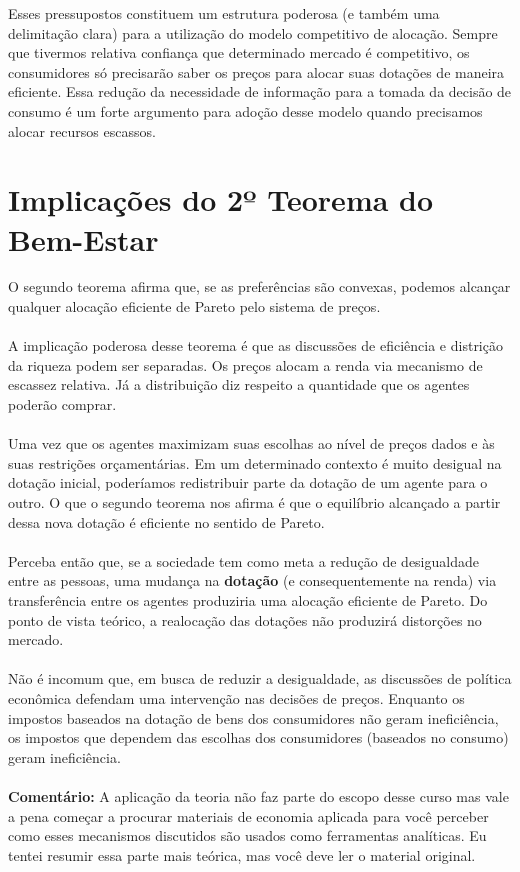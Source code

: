 \documentclass[a4paper,11pt,oneside]{book}
\theoremstyle{definition}
\theoremstyle{break}
\begin{document}
Esses pressupostos constituem um estrutura poderosa (e também uma delimitação clara) para a utilização do modelo competitivo de alocação. Sempre que tivermos relativa confiança que determinado mercado é competitivo, os consumidores só precisarão saber os preços para alocar suas dotações de maneira eficiente. Essa redução da necessidade de informação para a tomada da decisão de consumo é um forte argumento para adoção desse modelo quando precisamos alocar recursos escassos.

\section{Implicações do 2º Teorema do Bem-Estar}

O segundo teorema afirma que, se as preferências são convexas, podemos alcançar qualquer alocação eficiente de Pareto pelo sistema de preços.
\\
\\
A implicação poderosa desse teorema é que as discussões de eficiência e distrição da riqueza podem ser separadas. Os preços alocam a renda via mecanismo de escassez relativa. Já a distribuição diz respeito a quantidade que os agentes poderão comprar.
\\
\\
Uma vez que os agentes maximizam suas escolhas ao nível de preços dados e às suas restrições orçamentárias. Em um determinado contexto é muito desigual na dotação inicial, poderíamos redistribuir parte da dotação de um agente para o outro. O que o segundo teorema nos afirma é que o equilíbrio alcançado a partir dessa nova dotação é eficiente no sentido de Pareto.
\\
\\
Perceba então que, se a sociedade tem como meta a redução de desigualdade entre as pessoas, uma mudança na \textbf{dotação} (e consequentemente na renda) via transferência entre os agentes produziria uma alocação eficiente de Pareto. Do ponto  de vista teórico, a realocação das dotações não produzirá distorções no mercado.
\\
\\
Não é incomum que, em busca de reduzir a desigualdade, as discussões de política econômica defendam uma intervenção nas decisões de preços. Enquanto os impostos baseados na dotação de bens dos consumidores não geram ineficiência, os impostos que dependem das escolhas dos consumidores (baseados no consumo) geram ineficiência.
\\
\\
\textbf{Comentário:} A aplicação da teoria não faz parte do escopo desse curso mas vale a pena começar a procurar materiais de economia aplicada para você perceber como esses mecanismos discutidos são usados como ferramentas analíticas. Eu tentei resumir essa parte mais teórica, mas você deve ler o material original.
\end{document}
